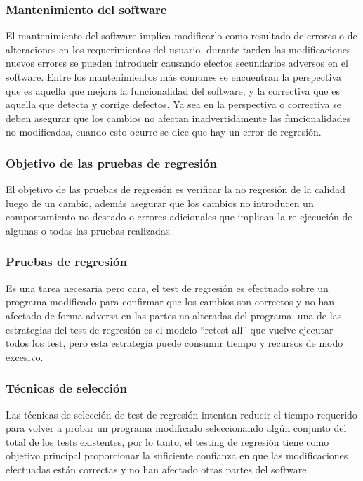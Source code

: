 \documentclass[conference]{IEEEtran}
\begin{document}
\subsubsection{Mantenimiento del software }

El mantenimiento del software implica modificarlo como resultado de errores o de alteraciones en los requerimientos del usuario, durante tarden las modificaciones nuevos errores se pueden introducir causando efectos secundarios adversos en el software. Entre los mantenimientos más comunes se encuentran la perspectiva que es aquella que mejora la funcionalidad del software, y la correctiva que es aquella que detecta y corrige defectos. Ya sea en la perspectiva o correctiva se deben asegurar que los cambios no afectan inadvertidamente las funcionalidades no modificadas, cuando esto ocurre se dice que hay un error de regresión.

\subsubsection{Objetivo de las pruebas de regresión}
 
 El objetivo de las pruebas de regresión es verificar la no regresión de la calidad luego de un cambio, además asegurar que los cambios no introducen un comportamiento no deseado o errores adicionales que implican la re ejecución de algunas o todas las pruebas realizadas. 
 
\subsubsection{Pruebas de regresión}

Es una tarea necesaria pero cara, el test de regresión es efectuado sobre un programa modificado para confirmar que los cambios son correctos y no han afectado de forma adversa en las partes no alteradas del programa, una de las estrategias del test de regresión es el modelo “retest all” que vuelve ejecutar todos los test, pero esta estrategia puede consumir tiempo y recursos de modo excesivo.

\subsubsection{Técnicas de selección}

 Las técnicas de selección de test de regresión intentan reducir el tiempo requerido para volver a probar un programa modificado seleccionando algún conjunto del total de los tests existentes, por lo tanto, el testing de regresión tiene como objetivo principal proporcionar la suficiente confianza en que las modificaciones efectuadas están correctas y no han afectado otras partes del software.
 
\end{document}
